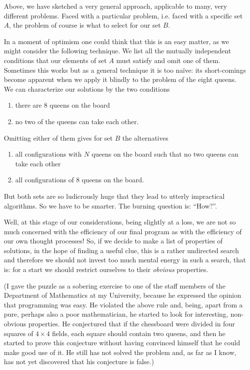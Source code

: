 Above, we have sketched a very general approach, applicable to many, very different problems. Faced with a particular problem, i.e. faced with a specific set $A$, the problem of course is what to select for our set $B$.

In a moment of optimism one could think that this is an easy matter, as we might consider the following technique. We list all the mutually independent conditions that our elements of set $A$ must satisfy and omit one of them. Sometimes this works but as a general technique it is too naïve: its short-comings become apparent when we apply it blindly to the problem of the eight queens. We can characterize our solutions by the two conditions

\begin{enumerate}[leftmargin=2\parindent, label=(\arabic*)]
	\item there are 8 queens on the board
	\item no two of the queens can take each other.
\end{enumerate}

Omitting either of them gives for set $B$ the alternatives

\begin{enumerate}[leftmargin=2.2\parindent, label=B\arabic*:]
	\item \label{en:b1-eight-queens}
	all configurations with $N$ queens on the board such that no two queens can take each other
	\item \label{en:b2-eight-queens}
	all configurations of 8 queens on the board.
\end{enumerate}

But both sets are so ludicrously huge that they lead to utterly impractical algorithms. So we have to be smarter. The burning question is: ``How?''.

Well, at this stage of our considerations, being slightly at a loss, we are not so much concerned with the efficiency of our final program as with the efficiency of our own thought processes! So, if we decide to make a list of properties of solutions, in the hope of finding a useful clue, this is a rather undirected search and therefore we should not invest too much mental energy in such a search, that is: for a start we should restrict ourselves to their \textit{obvious} properties.

(I gave the puzzle as a sobering exercise to one of the staff members of the Department of Mathematics at my University, because he expressed the opinion that programming was easy. He violated the above rule and, being, apart from a pure, perhaps also a poor mathematician, he started to look for interesting, non-obvious properties. He conjectured that if the chessboard were divided in four squares of $4\times 4$ fields, each square should contain two queens, and then he started to prove this conjecture without having convinced himself that he could make good use of it. He still has not solved the problem and, as far as I know, has not yet discovered that his conjecture is false.)

